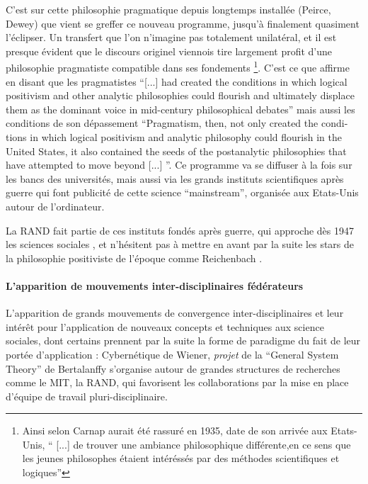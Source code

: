 C'est sur cette philosophie pragmatique depuis longtemps installée (Peirce, Dewey) que vient se greffer ce nouveau programme, jusqu'à finalement quasiment l'éclipser. Un transfert que l'on n'imagine pas totalement unilatéral, et il est presque évident que le discours originel viennois tire largement profit d'une philosophie pragmatiste compatible dans ses fondements \footnote{ Ainsi selon \textcite[149]{Ouelbani2006} Carnap aurait été rassuré en 1935, date de son arrivée aux Etats-Unis, \enquote{ [...] de trouver une ambiance philosophique différente,en ce sens que les jeunes philosophes étaient intéréssés par des méthodes scientifiques et logiques}}. C'est ce que \textcite[123]{Wilson1995} affirme en disant que les pragmatistes \foreignquote{english}{[...] had created the conditions in which logical positivism and other analytic philosophies could flourish and ultimately displace them as the dominant voice in mid-century philosophical debates} mais aussi les conditions de son dépassement \foreignquote{english}{Pragmatism, then, not only created the conditions in which logical positivism and analytic philosophy could flourish in the United States, it also contained the seeds of the postanalytic philosophies that have attempted to move beyond [...] }. Ce programme va se diffuser à la fois sur les bancs des universités, mais aussi via les grands instituts scientifiques après guerre qui font publicité de cette science \foreignquote{english}{mainstream}, organisée aux Etats-Unis autour de l'ordinateur. 

La RAND fait partie de ces instituts fondés après guerre, qui approche dès 1947 les sciences sociales \autocite{Rand106}, et n'hésitent pas à mettre en avant par la suite les stars de la philosophie positiviste de l'époque comme Reichenbach \autocite[384-385]{Barnes2011} .

\paragraph{L'apparition de mouvements inter-disciplinaires fédérateurs}

L'apparition de grands mouvements de convergence inter-disciplinaires et leur intérêt pour l'application de nouveaux concepts et techniques aux science sociales, dont certains prennent par la suite la forme de paradigme du fait de leur portée d'application : Cybernétique de Wiener, \textit{projet} de la \foreignquote{english}{General System Theory} de Bertalanffy \autocite[9]{Pouvreau2013} s'organise autour de grandes structures de recherches comme le MIT, la RAND, qui favorisent les collaborations par la mise en place d'équipe de travail pluri-disciplinaire.

